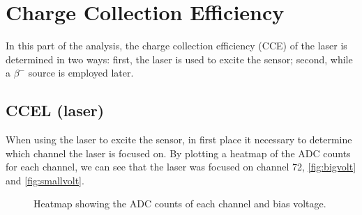 \section{Charge Collection Efficiency}

In this part of the analysis, the charge collection efficiency (CCE) of the laser is determined in two ways: first, the laser is used to excite the sensor; second, while a $\beta^{-}$ source is employed later.

\subsection{CCEL (laser)}

When using the laser to excite the sensor, in first place it necessary to determine which channel the laser is focused on. By plotting a heatmap of the ADC counts for each channel, we can see that the laser was focused on channel 72, \autoref{fig:bigvolt} and \autoref{fig:smallvolt}.
\begin{figure}[H]
	\centering
	\caption{Heatmap showing the ADC counts of each channel and bias voltage.}
	\label{fig:bigvolt}
\end{figure}

